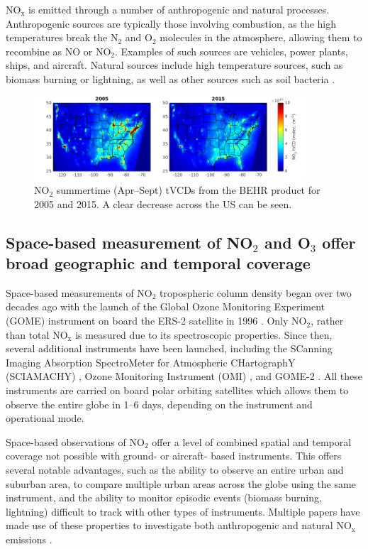 \documentclass[a4paper,10pt,oneside]{article}
\newcommand{\ce}[1]{$\mathrm{#1}$}
\begin{document}
\begin{sloppy}
\ce{NO_x} is emitted through a number of anthropogenic and natural processes. Anthropogenic sources are typically those involving combustion, as the high temperatures break the \ce{N_2} and \ce{O_2} molecules in the atmosphere, allowing them to recombine as \ce{NO} or \ce{NO_2}. Examples of such sources are vehicles, power plants, ships, and aircraft. Natural sources include high temperature sources, such as biomass burning or lightning, as well as other sources such as soil bacteria \cite{monks-beirle}.

\begin{figure}
\centering
\includegraphics[width=0.9\textwidth]{figs/no2vcds.png} 
\caption{\ce{NO_2} summertime (Apr--Sept) tVCDs from the BEHR product for 2005 and 2015. A clear decrease across the US can be seen.}
\label{fig:sat-obs}
\end{figure}

\subsection{Space-based measurement of NO$_2$ and O$_3$ offer broad geographic and temporal coverage}

Space-based measurements of \ce{NO_2} tropospheric column density began over two decades ago with the launch of the Global Ozone Monitoring Experiment (GOME) instrument on board the ERS-2 satellite in 1996 \cite{burrows99}. Only \ce{NO_2}, rather than total \ce{NO_x} is measured due to its spectroscopic properties. Since then, several additional instruments have been launched, including the SCanning Imaging Absorption SpectroMeter for Atmospheric CHartographY (SCIAMACHY) \cite{bovensmann99}, Ozone Monitoring Instrument (OMI) \cite{levelt06}, and GOME-2 \cite{callies00}. All these instruments are carried on board polar orbiting satellites which allows them to observe the entire globe in 1--6 days, depending on the instrument and operational mode.

Space-based observations of \ce{NO_2} offer a level of combined spatial and temporal coverage not possible with ground- or aircraft- based instruments.  This offers several notable advantages, such as the ability to observe an entire urban and suburban area, to compare multiple urban areas across the globe using the same instrument, and the ability to monitor episodic events (biomass burning, lightning) difficult to track with other types of instruments.  Multiple papers have made use of these properties to investigate both anthropogenic \cite{ding15, lamsal15, tong15, huang14, vinken14, gu13, miyazaki12, russell12, lin10, kim09} and natural \ce{NO_x} emissions \cite{miyazaki14, beirle10, castellanos14, mebust14, mebust13, zorner16}.


\end{sloppy}
\end{document}
